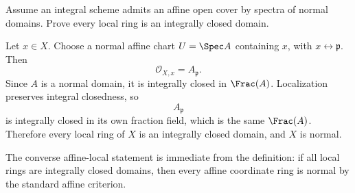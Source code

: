 \begin{problem}\label{prob:vi28-11}
Assume an integral scheme admits an affine open cover by spectra of normal domains. Prove every local ring is an integrally closed domain.

\end{problem}

\ifdefined\FullProblemDossiers
\begin{solution}
Let \(x\in X\). Choose a normal affine chart \(U=\Spec A\) containing \(x\), with
\(x\leftrightarrow\mathfrak p\). Then
\[
\mathcal O_{X,x}=A_{\mathfrak p}.
\]
Since \(A\) is a normal domain, it is integrally closed in \(\Frac(A)\). Localization preserves integral closedness, so
\[
A_{\mathfrak p}
\]
is integrally closed in its own fraction field, which is the same \(\Frac(A)\). Therefore every local ring of \(X\) is an integrally closed domain, and \(X\) is normal.

The converse affine-local statement is immediate from the definition: if all local rings are integrally closed domains, then every affine coordinate ring is normal by the standard affine criterion.
\end{solution}
\fi
